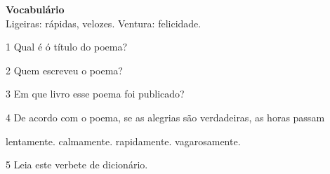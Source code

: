 
\textbf{Vocabulário}\\
Ligeiras: rápidas, velozes.
Ventura: felicidade.

\num{1} Qual é ó título do poema?


\num{2} Quem escreveu o poema?


\num{3} Em que livro esse poema foi publicado?


\num{4} De acordo com o poema, se as alegrias são verdadeiras, as horas passam

\begin{boxlist}
   lentamente.
   calmamente.
   rapidamente.
   vagarosamente.
\end{boxlist}

\num{5} Leia este verbete de dicionário.

